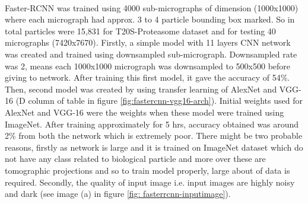 \documentclass{report}
\begin{document}
\noindent\\
Faster-RCNN was trained using 4000 sub-micrographs of dimension (1000x1000) where each micrograph had approx. 3 to 4 particle bounding box marked. So in total particles were 15,831 for T20S-Proteasome dataset and for testing 40 micrographs (7420x7670). Firstly, a simple model with 11 layers CNN network was created and trained using downsampled sub-micrograph. Downsampled rate was 2, means each 1000x1000 micrograph was downsampled to 500x500 before giving to network. After training this first model, it gave the accuracy of 54\%. Then, second model was created by using transfer learning of AlexNet and VGG-16 \cite{vgg16_simonyan2014very} (D column of table in figure \ref{fig:fastercnn-vgg16-arch}). Initial weights used for AlexNet and VGG-16 were the weights when these model were trained using ImageNet. After training approximately for 5 hrs, accuracy obtained was around 2\% from both the network which is extremely poor. There might be two probable reasons, firstly as network is large and it is trained on ImageNet dataset which do not have any class related to biological particle and more over these are tomographic projections and so to train model properly, large about of data is required. Secondly, the quality of input image i.e. input images are highly noisy and dark (see image (a) in figure \ref{fig: fasterrcnn-inputimage}). 
\end{document}
